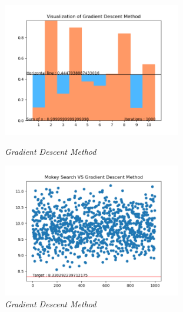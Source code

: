 \documentclass[12pt, a4paper, oneside]{article}
\begin{document}
\begin{figure}[H]
    \begin{minipage}[H]{0.5\linewidth} %
            \centering
            \includegraphics[width=7.8cm]{V of G.png}
            \caption{\textit{Gradient Descent Method}}
     \end{minipage}
     \begin{minipage}[H]{0.5\linewidth}
        \hspace{0.2mm}
         \includegraphics[width=7.8cm]{M of G.png}
         \caption{\textit{Gradient Descent Method}}
      \end{minipage}
\end{figure}
\end{document}
